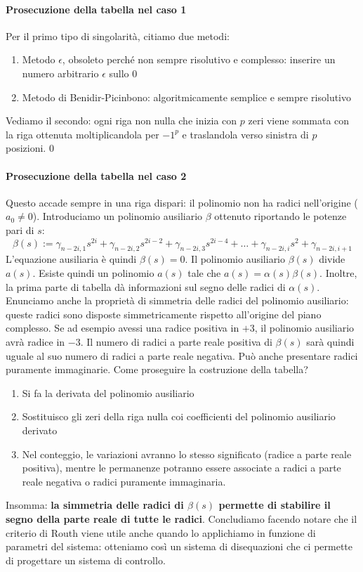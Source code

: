 \documentclass[11pt]{article}
\begin{document}
\paragraph{Prosecuzione della tabella nel caso 1} Per il primo tipo di singolarità, citiamo due metodi: 
\begin{enumerate}
    \item Metodo $\epsilon$, obsoleto perché non sempre risolutivo e complesso: inserire un numero arbitrario $\epsilon$ sullo 0
    \item Metodo di Benidir-Picinbono: algoritmicamente semplice e sempre risolutivo
\end{enumerate}
Vediamo il secondo: ogni riga non nulla che inizia con $p$ zeri viene sommata con la riga ottenuta moltiplicandola per $-1^p$ e traslandola verso sinistra di $p$ posizioni. 
0\paragraph{Prosecuzione della tabella nel caso 2} Questo accade sempre in una riga dispari: il polinomio non ha radici nell'origine ($a_0 \neq 0$). Introduciamo un polinomio ausiliario $\beta$ ottenuto riportando le potenze pari di $s$:
\begin{displaymath}
    \beta(s) := \gamma_{n-2i,1}s^{2i}+\gamma_{n-2i,2}s^{2i-2}+\gamma_{n-2i,3}s^{2i-4}+\dots+\gamma_{n-2i,i}s^{2}+\gamma_{n-2i,i+1}
\end{displaymath}
L'equazione ausiliaria è quindi $\beta(s) = 0$.
Il polinomio ausiliario $\beta(s)$ divide $a(s)$. Esiste quindi un polinomio $a(s)$ tale che $a(s) = \alpha(s)\beta(s)$. Inoltre, la prima parte di tabella dà informazioni sul segno delle radici di $\alpha(s)$. Enunciamo anche la proprietà di simmetria delle radici del polinomio ausiliario: queste radici sono disposte simmetricamente rispetto all'origine del piano complesso. Se ad esempio avessi una radice positiva in $+3$, il polinomio ausiliario avrà radice in $-3$. Il numero di radici a parte reale positiva di $\beta(s)$ sarà quindi uguale al suo numero di radici a parte reale negativa. Può anche presentare radici puramente immaginarie. Come proseguire la costruzione della tabella?
\begin{enumerate}
    \item Si fa la derivata del polinomio ausiliario 
    \item Sostituisco gli zeri della riga nulla coi coefficienti del polinomio ausiliario derivato 
    \item Nel conteggio, le variazioni avranno lo stesso significato (radice a parte reale positiva), mentre le permanenze potranno essere associate a radici a parte reale negativa o radici puramente immaginaria.
\end{enumerate}
Insomma: \textbf{la simmetria delle radici di $\beta(s)$ permette di stabilire il segno della parte reale di tutte le radici}.
Concludiamo facendo notare che il criterio di Routh viene utile anche quando lo applichiamo in funzione di parametri del sistema: otteniamo così un sistema di disequazioni che ci permette di progettare un sistema di controllo.
\end{document}
